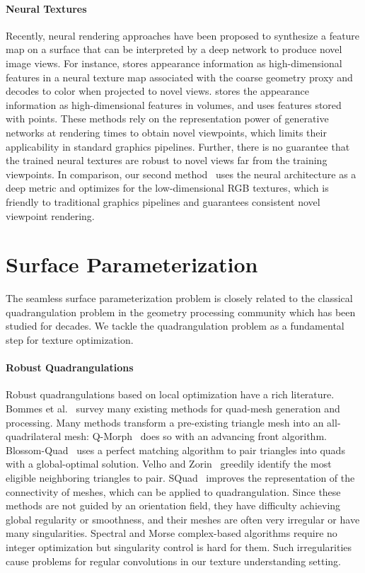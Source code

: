 \paragraph*{Neural Textures}
Recently, neural rendering approaches have been proposed to synthesize a feature map on a surface that can be interpreted by a deep network to produce novel image views.  For instance, \cite{thies2019deferred} stores appearance information as high-dimensional features in a neural texture map associated with the coarse geometry proxy and decodes to color when projected to novel views.  \cite{sitzmann2019deepvoxels} stores the appearance information as high-dimensional features in volumes, and \cite{aliev2019neural} uses features stored with points. These methods rely on the representation power of generative networks at rendering times to obtain novel viewpoints, which limits their applicability in standard graphics pipelines. Further, there is no guarantee that the trained neural textures are robust to novel views far from the training viewpoints. In comparison, our second method~\cite{huang2020adversarial} uses the neural architecture as a deep metric and optimizes for the low-dimensional RGB textures, which is friendly to traditional graphics pipelines and guarantees consistent novel viewpoint rendering.

\section{Surface Parameterization}
\label{related:param}
The seamless surface parameterization problem is closely related to the classical quadrangulation problem in the geometry processing community which has been studied for decades. We tackle the quadrangulation problem as a fundamental step for texture optimization.

\paragraph*{Robust Quadrangulations}
Robust quadrangulations based on local optimization have a rich literature. Bommes et al.~\cite{bommes2013quad} survey many existing methods for quad-mesh generation and processing.  Many methods transform a pre-existing triangle mesh into an all-quadrilateral mesh: Q-Morph~\cite{owen1999q} does so with an advancing front algorithm.  Blossom-Quad~\cite{remacle2012blossom} uses a perfect matching algorithm to pair triangles into quads with a global-optimal solution. Velho and Zorin~\cite{velho20014} greedily identify the most eligible neighboring triangles to pair. SQuad~\cite{gurung2011squad} improves the representation of the connectivity of meshes, which can be applied to quadrangulation.  Since these methods are not guided by an orientation field, they have difficulty achieving global regularity or smoothness, and their meshes are often very irregular or have many singularities.  Spectral and Morse complex-based algorithms \cite{dong2006spectral,zhang2010wave,ling2014spectral} require no integer optimization but singularity control is hard for them. Such irregularities cause problems for regular convolutions in our texture understanding setting.

